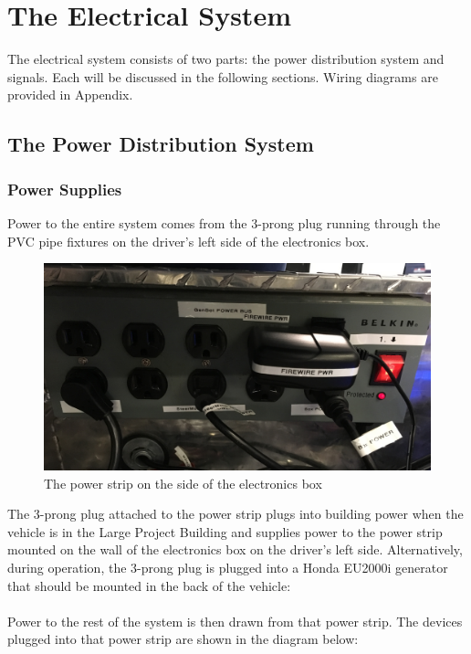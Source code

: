 \section{The Electrical System}

The electrical system consists of two parts: the power distribution system and signals. Each will be discussed in the following sections. Wiring diagrams are provided in Appendix.

\subsection{The Power Distribution System}

\subsubsection{Power Supplies}
Power to the entire system comes from the 3-prong plug running through the PVC pipe fixtures on the driver's left side of the electronics box.

\begin{figure}[h!]
\centering
\includegraphics[scale=.1]{Photos/PowerStrip.jpg}
\caption{The power strip on the side of the electronics box}
\label{fig:powerstrip}
\end{figure} 

 \noindent The 3-prong plug attached to the power strip plugs into building power when the vehicle is in the Large Project Building and supplies power to the power strip mounted on the wall of the electronics box on the driver's left side. Alternatively, during operation, the 3-prong plug is plugged into a Honda EU2000i generator that should be mounted in the back of the vehicle:\\ \\
%
 Power to the rest of the system is then drawn from that power strip. The devices plugged into that power strip are shown in the diagram below:\\ \\

